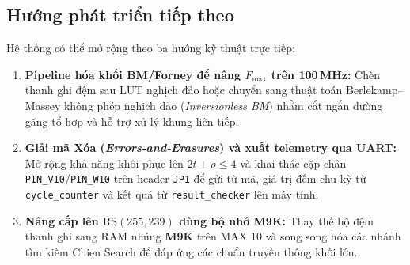 \documentclass[11pt,a4paper]{report}
\begin{document}
\subsection*{Hướng phát triển tiếp theo}
Hệ thống có thể mở rộng theo ba hướng kỹ thuật trực tiếp:
\begin{enumerate}
    \item \textbf{Pipeline hóa khối BM/Forney để nâng $F_{\max}$ trên 100\,MHz:} Chèn thanh ghi đệm sau LUT nghịch đảo hoặc chuyển sang thuật toán Berlekamp--Massey không phép nghịch đảo (\textit{Inversionless BM}) nhằm cắt ngắn đường găng tổ hợp và hỗ trợ xử lý khung liên tiếp.
    \item \textbf{Giải mã Xóa (\textit{Errors-and-Erasures}) và xuất telemetry qua UART:} Mở rộng khả năng khôi phục lên $2t + \rho \le 4$ và khai thác cặp chân \texttt{PIN\_V10}/\texttt{PIN\_W10} trên header \texttt{JP1} để gửi từ mã, giá trị đếm chu kỳ từ \texttt{cycle\_counter} và kết quả từ \texttt{result\_checker} lên máy tính.
    \item \textbf{Nâng cấp lên $\text{RS}(255,239)$ dùng bộ nhớ M9K:} Thay thế bộ đệm thanh ghi sang RAM nhúng \textbf{M9K} trên MAX 10 và song song hóa các nhánh tìm kiếm Chien Search để đáp ứng các chuẩn truyền thông khối lớn.
\end{enumerate}

\clearpage
{}
{}
\end{document}
